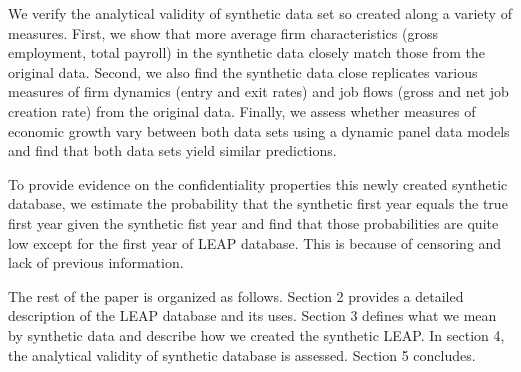 \documentclass{article}
\begin{document}
We verify the analytical validity of synthetic data set so created along a variety of measures. First, we show that more average firm characteristics (gross employment, total payroll) in the synthetic data closely match those from the original data. Second, we also find the synthetic data close replicates various measures of firm dynamics (entry and exit rates) and job flows (gross and net job creation rate) from the original data. Finally, we assess whether measures of economic growth vary between both data sets using a dynamic panel data models and find that both data sets yield similar predictions.

To provide evidence on the confidentiality properties this newly created  synthetic database, we estimate the probability that the synthetic first year equals the true first year given the synthetic fist year and find that those probabilities are quite low except for the first year of LEAP database. This is because of censoring and lack of previous information.

The rest of the paper is organized as follows. Section 2 provides a detailed description of the LEAP database and its uses. Section 3 defines what we mean by synthetic data and describe how we created the synthetic LEAP. In section 4, the analytical validity of synthetic database is assessed. Section 5 concludes.
\end{document}
